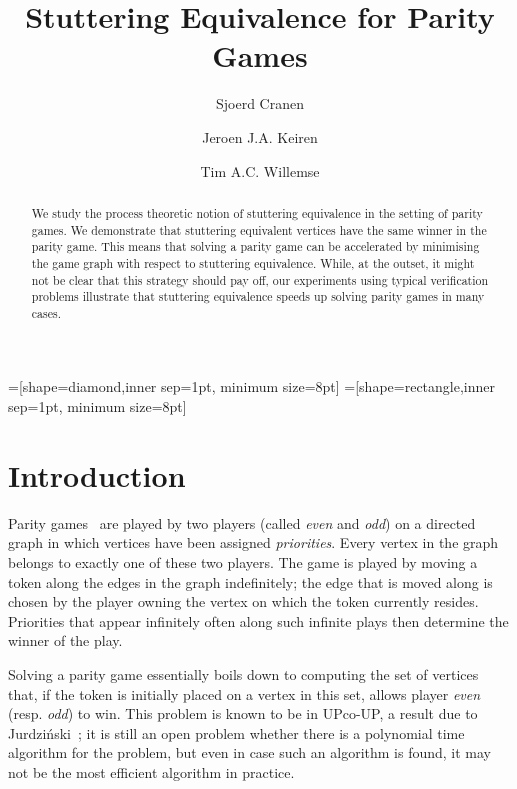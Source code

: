 \documentclass[a4paper]{llncs}
\begin{document}
=[shape=diamond,inner sep=1pt, minimum size=8pt]
=[shape=rectangle,inner sep=1pt, minimum size=8pt]  

\title{Stuttering Equivalence for Parity Games}
\author{Sjoerd Cranen \and Jeroen J.A. Keiren \and Tim A.C. Willemse}

\maketitle
\begin{abstract} We study the process theoretic notion of stuttering
equivalence in the setting of parity games. We demonstrate
that stuttering equivalent vertices have the same winner
in the parity game. This means that solving a parity game can be
accelerated by minimising the game graph with respect to stuttering
equivalence. While, at the outset, it might not be clear that this
strategy should pay off, our experiments using typical verification
problems illustrate that stuttering equivalence speeds up solving
parity games in many cases.

\end{abstract}


\section{Introduction}

Parity games~\cite{EJ:91,McN:93,Zie:98} are played by two players (called
\emph{even} and \emph{odd}) on a directed graph in which vertices have
been assigned \emph{priorities}.  Every vertex in the graph belongs to
exactly one of these two players. The game is played by moving a token
along the edges in the graph indefinitely; the edge that is moved along
is chosen by the player owning the vertex on which the token currently
resides. Priorities that appear infinitely often along such infinite
plays then determine the winner of the play.

Solving a parity game essentially boils down to computing the set of 
vertices that, if the token is initially placed on a vertex in this 
set, allows player \emph{even} (resp. \emph{odd}) to win. This problem 
is known to be in UPco-UP, a result due to 
Jurdzi\'nski~\cite{Jur:98}; it is still an open problem whether there
is a polynomial time algorithm for the problem, but even in case
such an algorithm is found, it may not be the most efficient algorithm
in practice.
\end{document}
